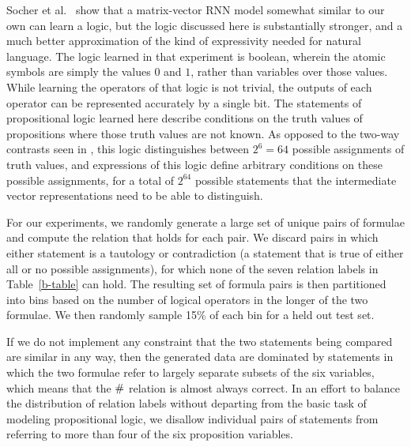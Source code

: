 Socher et al.~\cite{socher2012semantic} show that a matrix-vector RNN
model somewhat similar to our own can learn a logic, but the logic
discussed here is substantially stronger, and a much better
approximation of the kind of expressivity needed for natural
language. The logic learned in that experiment is boolean, wherein the
atomic symbols are simply the values $0$ and $1$, rather than
variables over those values. While learning the operators of that
logic is not trivial, the outputs of each operator can be represented
accurately by a single bit. The statements of propositional logic
learned here describe conditions on the truth values of propositions
where those truth values are not known. As opposed to the two-way
contrasts seen in \cite{socher2012semantic}, this logic distinguishes
between $2^{6} = 64$ possible assignments of truth values, and
expressions of this logic define arbitrary conditions on these
possible assignments, for a total of $2^{64}$ %
possible statements that the intermediate vector representations need
to be able to distinguish.

For our experiments, we randomly generate a large set of  unique pairs 
of formulae and compute the relation that holds for each pair.
We discard pairs in which either statement is a tautology or
contradiction (a statement that is true of either all or no possible
assignments), for which none of the seven relation labels in
Table~\ref{b-table} can hold. The resulting set of formula pairs is
then partitioned into bins based on the number of logical operators in
the longer of the two formulae. We then randomly sample 15\% of each
bin for a held out test set.

If we do not implement any constraint that the two statements being
compared are similar in any way, then the generated data are dominated
by statements in which the two formulae refer to largely separate
subsets of the six variables, which means that the $\mathbin{\#}$ relation
is almost always correct.  In an effort to balance the distribution of
relation labels without departing from the basic task of modeling
propositional logic, we disallow individual pairs of statements from
referring to more than four of the six proposition variables.

